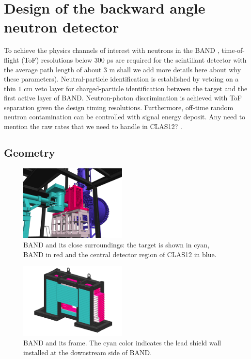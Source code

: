 \documentclass[3p,final,twocolumn]{elsarticle}
\begin{document}

\section{Design of the backward angle neutron detector}
To achieve the physics channels of interest with neutrons in the BAND \cite{band-proposal}, time-of-flight (ToF) resolutions below $300$ \si{\pico\second} are required for the scintillant detector with the average path length of about $3$ \si{\meter} {\color{red} shall we add more details here about why these parameters)}. Neutral-particle identification is established by vetoing on a thin $1$ \si{\centi\meter} veto layer for charged-particle identification between the target and the first active layer of BAND. Neutron-photon discrimination is achieved with ToF separation given the design 
timing resolutions. Furthermore, off-time random neutron contamination can be controlled with signal energy deposit. {\color{red} Any need to mention 
the raw rates that we need to handle in CLAS12?} .

\subsection{Geometry}

\begin{figure}[ht]
	\centering
		\includegraphics[width=0.48\textwidth]{FULL_CONTEXT_STUDIE_3.png}
		\caption{BAND and its close surroundings: the target is shown in cyan,  BAND in red and the central detector region of CLAS12 in blue. }
		\label{fig:bandtarget}
\end{figure}


\begin{figure}[ht]
	\centering
	\includegraphics[width=0.48\textwidth]{BAND_1-2.png}
		\caption{BAND and its frame. The cyan color indicates the lead shield wall installed at the downstream side of BAND.}
		\label{fig:band}
\end{figure}
\end{document}
